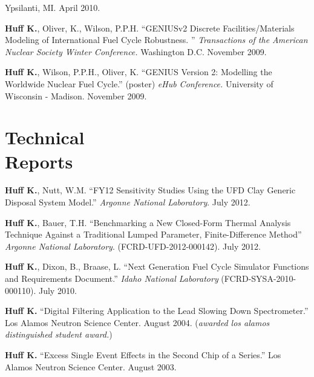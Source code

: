 \documentclass[margin,line]{resume}
\begin{document}
\begin{resume}
\begin{bibenum}
        Ypsilanti, MI. April 2010.
      \item \textbf{Huff K.}, Oliver, K., Wilson, P.P.H. ``GENIUSv2 Discrete Facilities/Materials Modeling of International 
        Fuel Cycle Robustness. ''
         \emph{Transactions of the American Nuclear Society Winter Conference.} 
        Washington D.C. November 2009. 
      \item \textbf{Huff K.}, Wilson, P.P.H., Oliver, K. ``GENIUS Version 2: Modelling the Worldwide Nuclear Fuel Cycle.'' 
        (poster)  \emph{eHub Conference.} University of Wisconsin - 
        Madison. November 2009.
    \end{bibenum}

    \pagebreak
    \section{\mysidestyle Technical\\Reports}
    \begin{bibenum}
      \item \textbf{Huff K.}, Nutt, W.M. ``FY12 Sensitivity Studies Using the UFD Clay Generic Disposal System Model.'' 
        \emph{Argonne National Laboratory}. July 2012.
      \item \textbf{Huff K.}, Bauer, T.H. ``Benchmarking a New Closed-Form Thermal Analysis Technique Against a Traditional
        Lumped Parameter, Finite-Difference Method'' \emph{Argonne National Laboratory}. (FCRD-UFD-2012-000142). July 2012.
      \item \textbf{Huff K.}, Dixon, B., Braase, L. ``Next Generation Fuel Cycle Simulator Functions and Requirements Document.'' 
        \emph{Idaho National Laboratory} (FCRD-SYSA-2010-000110). July 2010. 
      \item \textbf{Huff K.} ``Digital Filtering Application to the Lead Slowing Down 
        Spectrometer.'' Los Alamos Neutron Science Center. August 2004.  %
        (\emph{awarded los alamos distinguished student award.}) 
      \item \textbf{Huff K.} ``Excess Single Event Effects in the Second Chip of a Series.'' 
        Los Alamos Neutron Science Center. August 2003. 
    \end{bibenum}

\end{resume}
\end{document}
